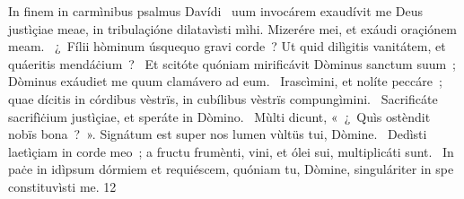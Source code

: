 { In finem in carmìnibus psalmus Davídi}
{%
~uum invocárem exaudívit me Deus justìçiae meae, in tribulaçióne dilatavìsti mìhi. Mizerére mei, et exáudi oraçiónem meam. 
~¿~Fílii hòminum úsquequo gravi corde~? Ut quid dilìgitis vanitátem, et quáeritis mendáċium~? 
~Et scitóte quóniam mirificávit Dòminus sanctum suum~; Dòminus exáudiet me quum clamávero ad eum. 
~Irascìmini, et nolíte peccáre~; quae dícitis in córdibus vèstrïs, in cubílibus vèstrïs compungìmini. 
~Sacrificáte sacrifìċium justìçiae, et speráte in Dòmino. 
~Mùlti dicunt, «~¿~Quìs ostèndit nobïs bona~?~». Signátum est super nos lumen vùltüs tui, Dòmine. 
~Dedìsti laetìçiam in corde meo~; a fructu frumènti, vini, et ólei sui, multiplicáti sunt. 
~In paċe in idìpsum dórmiem et requiéscem, quóniam tu, Dòmine, singuláriter in spe constituvìsti me. 
}
{1}{2}
